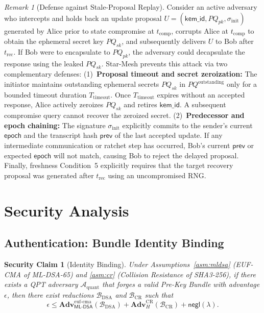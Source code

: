 \documentclass[11pt,a4paper]{article}
\newtheorem{securityclaim}[theorem]{Security Claim}
\theoremstyle{remark}
\newtheorem{remark}[theorem]{Remark}
\theoremstyle{plain}
\newcommand{\negl}{\mathsf{negl}}
\newcommand{\Adv}{\mathbf{Adv}}
\newcommand{\calA}{\mathcal{A}}
\newcommand{\calB}{\mathcal{B}}
\newcommand{\MLDSA}{\mathsf{ML\text{-}DSA}}
\begin{document}
\begin{remark}[Defense against Stale-Proposal Replay]
\label{rem:stale-proposal}
Consider an active adversary who intercepts and holds back an update proposal $U = (\mathsf{kem\_id}, PQ_{pk}, \sigma_{\mathrm{init}})$ generated by Alice prior to state compromise at $t_{\mathrm{comp}}$, corrupts Alice at $t_{\mathrm{comp}}$ to obtain the ephemeral secret key $PQ_{sk}$, and subsequently delivers $U$ to Bob after $t_{\mathrm{rec}}$.  If Bob were to encapsulate to $PQ_{pk}$, the adversary could decapsulate the response using the leaked $PQ_{sk}$.
Star-Mesh prevents this attack via two complementary defenses:
(1)~\textbf{Proposal timeout and secret zeroization:} The initiator maintains outstanding ephemeral secrets $PQ_{sk}$ in $PQ^{\mathrm{outstanding}}$ only for a bounded timeout duration $T_{\mathrm{timeout}}$.  Once $T_{\mathrm{timeout}}$ expires without an accepted response, Alice actively zeroizes $PQ_{sk}$ and retires $\mathsf{kem\_id}$.  A subsequent compromise query cannot recover the zeroized secret.
(2)~\textbf{Predecessor and epoch chaining:} The signature $\sigma_{\mathrm{init}}$ explicitly commits to the sender's current $\mathsf{epoch}$ and the transcript hash $\mathsf{prev}$ of the last accepted update.  If any intermediate communication or ratchet step has occurred, Bob's current $\mathsf{prev}$ or expected $\mathsf{epoch}$ will not match, causing Bob to reject the delayed proposal.  Finally, freshness Condition~5 explicitly requires that the target recovery proposal was generated after $t_{\mathrm{rec}}$ using an uncompromised RNG.
\end{remark}

\section{Security Analysis}
\label{sec:security}

\subsection{Authentication: Bundle Identity Binding}
\label{sec:fsremark}

\begin{securityclaim}[Identity Binding]
\label{thm:auth}
Under Assumptions~\ref{asm:mldsa} (EUF-CMA of ML-DSA-65) and \ref{asm:cr} (Collision Resistance of SHA3-256), if there exists a QPT adversary
$\calA_{\mathrm{quant}}$ that forges a valid Pre-Key Bundle with advantage $\epsilon$, then
there exist reductions $\calB_{\mathrm{DSA}}$ and $\calB_{\mathrm{CR}}$ such that
\[
  \epsilon \leq \Adv^{\mathrm{euf\text{-}cma}}_{\MLDSA}(\calB_{\mathrm{DSA}}) + \Adv_{H}^{\mathrm{CR}}(\calB_{\mathrm{CR}}) + \negl(\lambda).
\]
\end{securityclaim}
\end{document}
